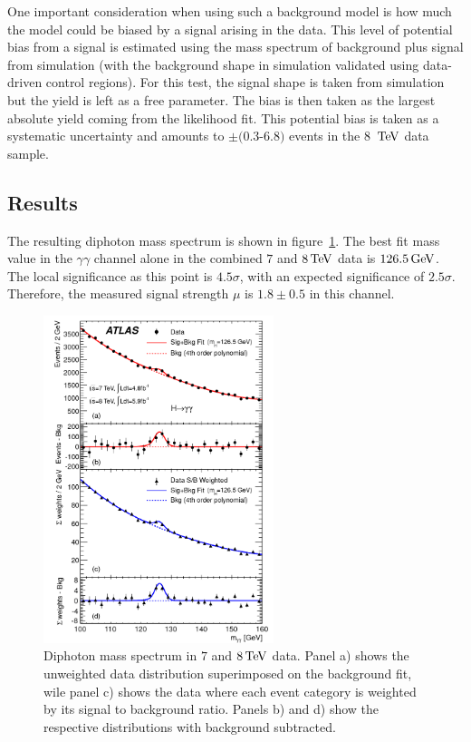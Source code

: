 One important consideration when using such a background model is how much the model could be biased by a signal arising in the data. This level of potential bias from a signal is estimated using the mass spectrum of background plus signal from simulation (with the background shape in simulation validated using data-driven control regions). For this test, the signal shape is taken from simulation but the yield is left as a free parameter. The bias is then taken as the largest absolute yield coming from the likelihood fit. This potential bias is taken as a systematic uncertainty and amounts to $\pm(0.3$-$6.8)$ events in the 8 $\TeV$ data sample. 

\subsection{Results}

The resulting diphoton mass spectrum is shown in figure~\ref{fig:disc_mgg}. The best fit mass value in the $\gamma\gamma$ channel alone in the combined $7$ and $8 \TeV$ data is $126.5 \GeV$. The local significance as this point is $4.5\sigma$, with an expected significance of $2.5\sigma$. Therefore, the measured signal strength $\mu$ is $1.8 \pm 0.5$ in this channel. 

\begin{figure}[h!]
  \centering
  \captionsetup{justification=centering}
  \includegraphics[width=0.6\textwidth]{figures/discovery_mgg}
  \caption{Diphoton mass spectrum in $7$ and $8 \TeV$ data. Panel a) shows the unweighted data distribution superimposed on the background fit, wile panel c) shows the data where each event category is weighted by its signal to background ratio. Panels b) and d) show the respective distributions with background subtracted\cite{Discovery}.}
  \label{fig:disc_mgg}
\end{figure}

